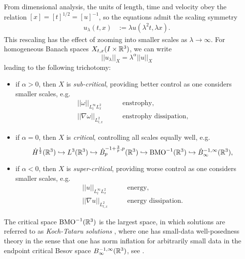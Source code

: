 From dimensional analysis, the units of length, time and velocity obey the relation $[x] = [t]^{1/2} = [u]^{-1}$, so the equations admit the scaling symmetry
	\begin{align*}
		u_\lambda (t, x)
			&:= \lambda u (\lambda^2 t, \lambda x).
	\end{align*}
This rescaling has the effect of zooming into smaller scales as $\lambda \to \infty$. For homogeneous Banach spaces $X_{t, x} (I \times \mathbb R^3)$, we can write
	\[
		||u_\lambda||_{X} = \lambda^\alpha ||u||_X
	\]	
leading to the following trichotomy:
	\begin{itemize}
		\item if $\alpha > 0$, then $X$ is \emph{sub-critical}, providing better control as one considers smaller scales, e.g. 
			\begin{align*}
				||\omega||_{L^\infty_t L^2_x}
					&\qquad \text{enstrophy}, \\
				||\nabla \omega||_{L^2_{t, x}}
					&\qquad \text{enstrophy dissipation},
			\end{align*}
			
		
		\item if $\alpha = 0$, then $X$ is \emph{critical}, controlling all scales equally well, e.g.
				\[
		\dot H^{\frac12} (\mathbb R^3) \hookrightarrow L^3 (\mathbb R^3) \hookrightarrow \dot B^{-1 + \frac3p, p}_p (\mathbb R^3) \hookrightarrow \mathrm{BMO}^{-1} (\mathbb R^3) \hookrightarrow \dot B^{-1, \infty}_\infty (\mathbb R^3),
	\]	
		
		\item if $\alpha < 0$, then $X$ is \emph{super-critical}, providing worse control as one considers smaller scales, e.g.
			\begin{align*}
				||u||_{L^\infty_t L^2_x}
					&\qquad \text{energy}, \\
				||\nabla u||_{L^2_{t, x}}
					&\qquad \text{energy dissipation}.	
			\end{align*}
	\end{itemize}
	
\begin{remark}
	The critical space $\mathrm{BMO}^{-1} (\mathbb R^3)$ is the largest space, in which solutions are referred to as \emph{Koch-Tataru solutions} \cite{KochTataru2001}, where one has small-data well-posedness theory in the sense that one has norm inflation for arbitrarily small data in the endpoint critical Besov space $B^{-1, \infty}_\infty (\mathbb R^3)$, see \cite{BourgainPavlovic2008}.	
\end{remark}

